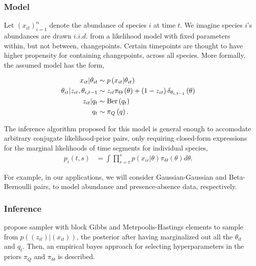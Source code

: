 \documentclass{article}
\begin{document}
\subsubsection{Model}
\label{subsec:basic_model}

Let $\left(x_{it}\right)_{i = 1}^{n}$ denote the abundance of species $i$ at
time $t$. We imagine species $i$'s abundances are drawn $i.i.d.$ from a
likelihood model with fixed parameters within, but not between, changepoints.
Certain timepoints are thought to have higher propensity for containing
changepoints, across all species. More formally, the assumed model has the form,

\begin{align*}
  x_{it} \vert \theta_{it} &\sim p\left(x_{it} \vert \theta_{it}\right) \\
  \theta_{it} \vert z_{it}, \theta_{i,t - 1} &\sim z_{it}\pi_{\Theta}\left(\theta\right) + \left(1 - z_{it}\right) \delta_{\theta_{i, t - 1}}\left(\theta\right) \\
  z_{it} \vert q_{t} &\sim \textnormal{Ber}\left(q_{t}\right) \\
  q_t &\sim \pi_{Q}\left(q\right).
\end{align*}

The inference algorithm proposed for this model is general enough to accomodate
arbitrary conjugate likelihood-prior pairs, only requiring closed-form
expressions for the marginal likelihoods of time segments for individual
species,
\begin{align*}
  p_i\left(t, s\right) &= \int \prod_{r = t}^{s} p\left(x_{ir} \vert \theta\right) \pi_{\Theta}\left(\theta\right) d\theta.
\end{align*}

For example, in our applications, we will consider Gaussian-Gaussian and
Beta-Bernoulli pairs, to model abundance and presence-absence data,
respectively.

\subsubsection{Inference}
\label{subsubsec:basic_inference}

\cite{fan2015empirical} propose sampler with block Gibbs and Metrpoolis-Hastings
elements to sample from $p\left(\left(z_{it}\right) \vert
\left(x_{it}\right)\right)$, the posterior after having marginalized out all the
$\theta_{it}$ and $q_t$. Then, an empirical bayes approach for selecting
hyperparameters in the priors $\pi_{Q}$ and $\pi_{\Theta}$ is described.
\end{document}
